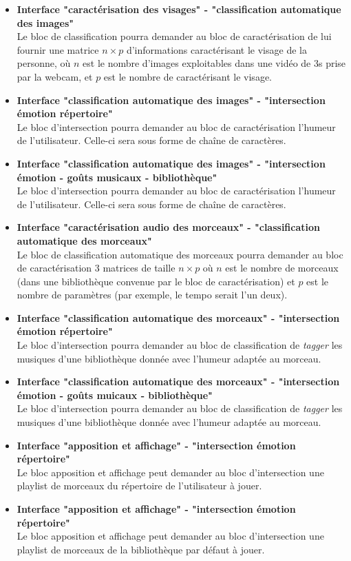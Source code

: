 \begin{itemize}
	\item \textbf{Interface "caractérisation des visages" - "classification automatique des images"\\}
		Le bloc de classification pourra demander au bloc de caractérisation de lui fournir une matrice $n \times p$ d'informations caractérisant le visage de la personne, où $n$ est le nombre d'images exploitables dans une vidéo de 3s prise par la webcam, et $p$ est le nombre de caractérisant le visage.
	\item \textbf{Interface "classification automatique des images" - "intersection émotion répertoire"\\}
		Le bloc d'intersection pourra demander au bloc de caractérisation l'humeur de l'utilisateur.
		Celle-ci sera sous forme de chaîne de caractères.
	\item \textbf{Interface "classification automatique des images" - "intersection émotion - goûts musicaux - bibliothèque"\\}
		Le bloc d'intersection pourra demander au bloc de caractérisation l'humeur de l'utilisateur.
		Celle-ci sera sous forme de chaîne de caractères.
	\item \textbf{Interface "caractérisation audio des morceaux" - "classification automatique des morceaux"\\}
		Le bloc de classification automatique des morceaux pourra demander au bloc de caractérisation 3 matrices de taille $n \times p$ où $n$ est le nombre de morceaux (dans une bibliothèque convenue par le bloc de caractérisation) et $p$ est le nombre de paramètres (par exemple, le tempo serait l'un deux).
	\item \textbf{Interface "classification automatique des morceaux" - "intersection émotion répertoire"\\}
		Le bloc d'intersection pourra demander au bloc de classification de \textit{tagger} les musiques d'une bibliothèque donnée avec l'humeur adaptée au morceau.
	\item \textbf{Interface "classification automatique des morceaux" - "intersection émotion - goûts muicaux - bibliothèque"\\}
		Le bloc d'intersection pourra demander au bloc de classification de \textit{tagger} les musiques d'une bibliothèque donnée avec l'humeur adaptée au morceau.
	\item \textbf{Interface "apposition et affichage" - "intersection émotion répertoire"\\}
		Le bloc apposition et affichage peut demander au bloc d'intersection une playlist  de morceaux du répertoire de l'utilisateur à jouer.
	\item \textbf{Interface "apposition et affichage" - "intersection émotion répertoire"\\}
		Le bloc apposition et affichage peut demander au bloc d'intersection une playlist  de morceaux de la bibliothèque par défaut à jouer.
\end{itemize}